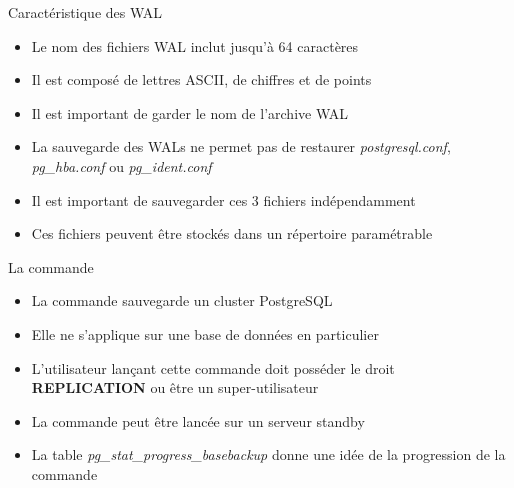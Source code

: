 
\begin{frame}[fragile]{Caractéristique des WAL}

\begin{itemize}

   \item Le nom des fichiers WAL inclut jusqu'à 64 caractères
   \item Il est composé de lettres ASCII, de chiffres et de points
   \item Il est important de garder le nom de l'archive WAL
   \item La sauvegarde des WALs ne permet pas de restaurer \textit{postgresql.conf}, \textit{pg\_hba.conf} ou \textit{pg\_ident.conf}
   \item Il est important de sauvegarder ces 3 fichiers indépendamment
   \item Ces fichiers peuvent être stockés dans un répertoire paramétrable

\end{itemize}

\end{frame}


\begin{frame}[fragile]{La commande }

\begin{itemize}

\item La commande  sauvegarde un cluster PostgreSQL
\item Elle ne s'applique sur une base de données en particulier
\item L'utilisateur lançant cette commande doit posséder le droit \textbf{REPLICATION} ou être un super-utilisateur
\item La commande peut être lancée sur un serveur standby
\item La table \textit{pg\_stat\_progress\_basebackup} donne une idée de la progression de la commande

\end{itemize}

\begin{toile}
\end{toile}

\end{frame}

